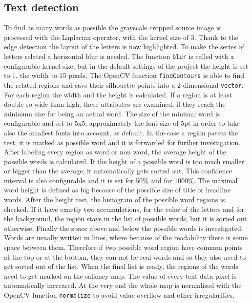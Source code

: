 \documentclass[draft,final]{vutinfth} %
\begin{document}
	\subsection{Text detection}
	To find as many words as possible the grayscale cropped source image is processed with the Laplacian operator, with the kernel size of 3.
	Thank to the edge detection the layout of the letters is now highlighted.
	To make the series of letters related a horizontal blur is needed.
	The function \texttt{blur} is called with a configurable kernel size, but in the default settings of the project the height is set to 1, the width to 15 pixels.
	The OpenCV function  \texttt{findContours} is able to find the related regions and save their silhouette points into a 2 dimensional \texttt{vector}.
	For each region the width and the height is calculated.
	If a region is at least double so wide than high, these attributes are examined, if they reach the minimum size for being an actual word.
	The size of the minimal word is configurable and set to 5x5, approximately the font size of 5pt in order to take also the smallest fonts into account, as default.
	In the case a region passes the test, it is marked as possible word and it is forwarded for further investigation.
	After labeling every region as word or non word, the average height of the possible words is calculated.
	If the height of a possible word is too much smaller or bigger than the average, it automatically gets sorted out.
	This confidence interval is also configurable and it is set for 50\% and for 1000\%. 
	The maximal word height is defined as big because of the possible size of title or headline words.
	After the height test, the histogram of the possible word regions is checked.
	If it have exactly two accumulations, for the color of the letters and for the background, the region stays in the list of possible words, but it is sorted out otherwise.
	Finally the space above and below the possible words is investigated.
	Words are usually written in lines, where because of the readability there is some space between them.
	Therefore if two possible word region have common points at the top or at the bottom, they can not be real words and so they also need to get sorted out of the list.
	When the final list is ready, the regions of the words need to get marked on the saliency map.
	The value of every text data pixel is automatically increased.
	At the very end the whole map is normalized with the OpenCV function \texttt{normalize} to avoid value overflow and other irregularities.  
	
\end{document}
